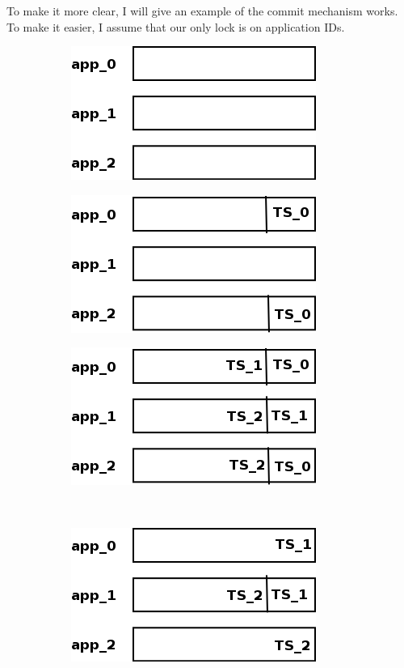 To make it more clear, I will give an example of the commit mechanism
works. To make it easier, I assume that our only lock is on
application IDs.

\begin{figure}
  \centering
  \begin{subfigure}[t]{0.3\textwidth}
    \includegraphics[scale=0.4]{resources/images/Implementation/commit_system_0.png}
    \label{fig:impl_tx_aggr_sub0}
    \caption{}
  \end{subfigure}
  \hfill
  \begin{subfigure}[t]{0.3\textwidth}
    \includegraphics[scale=0.4]{resources/images/Implementation/commit_system_1.png}
    \label{fig:impl_tx_aggr_sub1}
    \caption{}
  \end{subfigure}
  \hfill
  \begin{subfigure}[t]{0.3\textwidth}
    \includegraphics[scale=0.4]{resources/images/Implementation/commit_system_2.png}
    \label{fig:impl_tx_aggr_sub2}
    \caption{}
  \end{subfigure}
  \\[2em]
  \begin{subfigure}[t]{0.3\textwidth}
    \includegraphics[scale=0.4]{resources/images/Implementation/commit_system_3.png}

\end{subfigure}
\end{figure}
